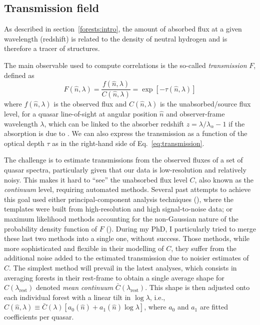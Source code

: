 \subsection{Transmission field}
\label{forests:bao:transmission}

As described in section~\ref{forests:intro}, the amount of absorbed 
flux at a given wavelength (redshift) is related to the density 
of neutral hydrogen and is therefore a tracer of structures.  

The main observable used to compute correlations is the so-called
\emph{transmission} $F$, defined as 
\begin{equation}
    F(\hat{n}, \lambda) = \frac{f(\hat{n}, \lambda)}{C(\hat{n}, \lambda)} = \exp{\left[-\tau(\hat{n}, \lambda) \right]}
    \label{eq:transmission}
\end{equation} 
where 
$f(\hat{n}, \lambda)$ is the observed flux and 
$C(\hat{n}, \lambda)$ is the unabsorbed/source flux level, 
for a quasar line-of-sight at angular position $\hat{n}$ 
and observer-frame wavelength $\lambda$, which can be linked to the
absorber redshift $z = \lambda/\lambda_\alpha - 1$ if the absorption is 
due to \lya. We can also express the transmission as a function of the 
optical depth $\tau$ as in the right-hand side of Eq.~\ref{eq:transmission}.

The challenge is to estimate transmissions from the observed fluxes of a set of quasar
spectra, particularly given that our data is low-resolution and relatively noisy.
This makes it hard to ``see'' the unabsorbed flux level $C$, also known as the 
\emph{continuum} level, requiring automated methods. 
Several past attempts to achieve this goal
used either principal-component analysis techniques 
(\cite{leeMeanfluxregulatedPrincipalComponent2012}), where the templates were built from 
high-resolution and high signal-to-noise data; or maximum likelihood methods accounting
for the non-Gaussian nature of the probability density function of $F$ 
(\cite{buscaBaryonAcousticOscillations2013}). 
During my PhD, I particularly tried to merge these 
last two methods into a single one, without success. 
Those methods, while more sophisticated and flexible in their modelling of $C$, 
they suffer from the additional noise added to the estimated transmission 
due to noisier estimates of $C$. 
The simplest method will prevail in the latest
analyses, which consists in averaging forests in their rest-frame to obtain a
single average shape for $C(\lambda_\text{rest})$ denoted \emph{mean continuum} $\bar{C}(\lambda_\text{rest})$. 
This shape is then adjusted onto each individual forest with a linear tilt in $\log \lambda$,
i.e., $C(\hat{n}, \lambda) \equiv \bar{C}(\lambda) [ a_0(\hat{n}) + a_1(\hat{n})\log \lambda]$,
where $a_0$ and $a_1$ are fitted coefficients per quasar. 

